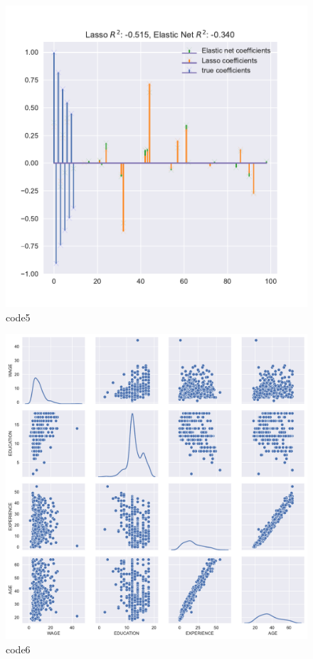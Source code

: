 \begin{figure}[htbp]
	\centering
	\includegraphics[width=14cm]{codeimage/code5}
	\caption{code5}
	\label{code5}
\end{figure}

\begin{PythonCode}\label{例7}
	
\end{PythonCode}

\begin{figure}[htbp]
	\centering
	\includegraphics[width=14cm]{codeimage/code6}
	\caption{code6}
	\label{code6}
\end{figure}

